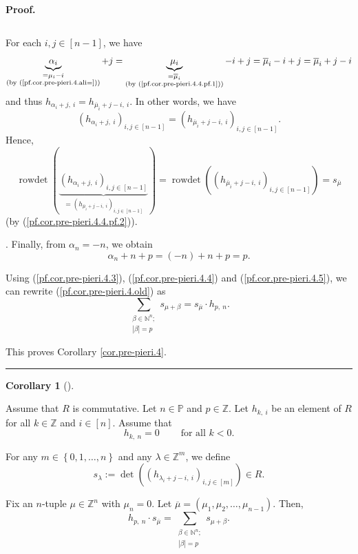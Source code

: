 \documentclass[numbers=enddot,12pt,final,onecolumn,notitlepage,english]{scrartcl}%
\theoremstyle{definition}
\newtheorem{coro}[theo]{Corollary}
\newenvironment{corollary}[1][]
{\begin{coro}[#1]\begin{leftbar}}
{\end{leftbar}\end{coro}}
\newenvironment{proof}[1][Proof]{\noindent\textbf{#1.} }{\ \rule{0.5em}{0.5em}}
\let\sumnonlimits\sum
\renewcommand{\sum}{\sumnonlimits\limits}
\newenvironment{verlong}{}{}
\begin{document}
\begin{proof}
\begin{verlong}
{\begin{equation}
\label{pf.cor.pre-pieri.4.4.pf.2}%
\end{equation}
\par
For each $i,j\in\left[  n-1\right]  $, we have
\[
\underbrace{\alpha_{i}}_{\substack{=\mu_{i}-i\\\text{(by
(\ref{pf.cor.pre-pieri.4.ali=}))}}}+j=\underbrace{\mu_{i}}%
_{\substack{=\overline{\mu}_{i}\\\text{(by (\ref{pf.cor.pre-pieri.4.4.pf.1}%
))}}}-i+j=\overline{\mu}_{i}-i+j=\overline{\mu}_{i}+j-i
\]
and thus $h_{\alpha_{i}+j,\ i}=h_{\overline{\mu}_{i}+j-i,\ i}$. In other
words, we have
\[
\left(  h_{\alpha_{i}+j,\ i}\right)  _{i,j\in\left[  n-1\right]  }=\left(
h_{\overline{\mu}_{i}+j-i,\ i}\right)  _{i,j\in\left[  n-1\right]  }.
\]
Hence,%
\[
\operatorname*{rowdet}\left(  \underbrace{\left(  h_{\alpha_{i}+j,\ i}\right)
_{i,j\in\left[  n-1\right]  }}_{=\left(  h_{\overline{\mu}_{i}+j-i,\ i}%
\right)  _{i,j\in\left[  n-1\right]  }}\right)  =\operatorname*{rowdet}\left(
\left(  h_{\overline{\mu}_{i}+j-i,\ i}\right)  _{i,j\in\left[  n-1\right]
}\right)  =s_{\overline{\mu}}%
\]
(by (\ref{pf.cor.pre-pieri.4.4.pf.2})).}. Finally, from $\alpha_{n}=-n$, we
obtain
\begin{equation}
\alpha_{n}+n+p=\left(  -n\right)  +n+p=p. \label{pf.cor.pre-pieri.4.5}%
\end{equation}


Using (\ref{pf.cor.pre-pieri.4.3}), (\ref{pf.cor.pre-pieri.4.4}) and
(\ref{pf.cor.pre-pieri.4.5}), we can rewrite (\ref{pf.cor.pre-pieri.4.old}) as%
\[
\sum_{\substack{\beta\in\mathbb{N}^{n};\\\left\vert \beta\right\vert
=p}}s_{\mu+\beta}=s_{\overline{\mu}}\cdot h_{p,\ n}.
\]

\end{verlong}

\noindent This proves Corollary \ref{cor.pre-pieri.4}.
\end{proof}

\begin{corollary}
\label{cor.pre-pieri.4comm}Assume that $R$ is commutative. Let $n\in
\mathbb{P}$ and $p\in\mathbb{Z}$. Let $h_{k,\ i}$ be an element of $R$ for all
$k\in\mathbb{Z}$ and $i\in\left[  n\right]  $. Assume that%
\[
h_{k,\ n}=0\ \ \ \ \ \ \ \ \ \ \text{for all }k<0.
\]


For any $m\in\left\{  0,1,\ldots,n\right\}  $ and any $\lambda\in
\mathbb{Z}^{m}$, we define%
\[
s_{\lambda}:=\det\left(  \left(  h_{\lambda_{i}+j-i,\ i}\right)
_{i,j\in\left[  m\right]  }\right)  \in R.
\]


Fix an $n$-tuple $\mu\in\mathbb{Z}^{n}$ with $\mu_{n}=0$. Let $\overline{\mu
}=\left(  \mu_{1},\mu_{2},\ldots,\mu_{n-1}\right)  $. Then,%
\begin{equation}
h_{p,\ n}\cdot s_{\overline{\mu}}=\sum_{\substack{\beta\in\mathbb{N}%
^{n};\\\left\vert \beta\right\vert =p}}s_{\mu+\beta}.
\label{eq.cor.pre-pieri.4comm.eq}%
\end{equation}

\end{corollary}
\end{document}
